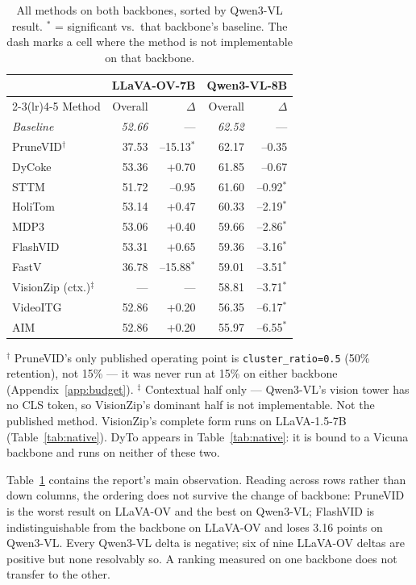 \documentclass[11pt]{article}
\begin{document}
\begin{table}[H]
  \centering
  \small
  \caption{All methods on both backbones, sorted by Qwen3-VL result.
  $^{*}$ = significant vs.\ that backbone's baseline. The dash marks a cell
  where the method is not implementable on that backbone.}
  \label{tab:summary}
  \begin{tabular}{lrrrr}
    \toprule
    & \multicolumn{2}{c}{LLaVA-OV-7B} & \multicolumn{2}{c}{Qwen3-VL-8B} \\
    \cmidrule(lr){2-3}\cmidrule(lr){4-5}
    Method & Overall & $\Delta$ & Overall & $\Delta$ \\
    \midrule
    \textit{Baseline} & \textit{52.66} & --- & \textit{62.52} & --- \\
    \midrule
    PruneVID$^{\dagger}$ & 37.53 & --15.13$^{*}$ & 62.17 & --0.35 \\
    DyCoke & 53.36 & +0.70 & 61.85 & --0.67 \\
    STTM & 51.72 & --0.95 & 61.60 & --0.92$^{*}$ \\
    HoliTom & 53.14 & +0.47 & 60.33 & --2.19$^{*}$ \\
    MDP3 & 53.06 & +0.40 & 59.66 & --2.86$^{*}$ \\
    FlashVID & 53.31 & +0.65 & 59.36 & --3.16$^{*}$ \\
    FastV & 36.78 & --15.88$^{*}$ & 59.01 & --3.51$^{*}$ \\
    VisionZip (ctx.)$^{\ddagger}$ & --- & --- & 58.81 & --3.71$^{*}$ \\
    VideoITG & 52.86 & +0.20 & 56.35 & --6.17$^{*}$ \\
    AIM & 52.86 & +0.20 & 55.97 & --6.55$^{*}$ \\
    \bottomrule
  \end{tabular}
\end{table}

\noindent\footnotesize
$^{\dagger}$ PruneVID's only published operating point is
\texttt{cluster\_ratio=0.5} (50\% retention), not 15\% --- it was never run
at 15\% on either backbone (Appendix~\ref{app:budget}). \quad
$^{\ddagger}$ Contextual half only --- Qwen3-VL's vision tower has no CLS
token, so VisionZip's dominant half is not implementable. Not the published
method. VisionZip's complete form runs on LLaVA-1.5-7B
(Table~\ref{tab:native}). \quad
DyTo appears in Table~\ref{tab:native}: it is bound to a Vicuna backbone and
runs on neither of these two.\normalsize

\medskip

Table~\ref{tab:summary} contains the report's main observation. Reading
across rows rather than down columns, the ordering does not survive the
change of backbone: PruneVID is the worst result on LLaVA-OV and the best on
Qwen3-VL; FlashVID is indistinguishable from the backbone on LLaVA-OV and
loses 3.16 points on Qwen3-VL. Every Qwen3-VL delta is negative; six of nine
LLaVA-OV deltas are positive but none resolvably so. A ranking measured on
one backbone does not transfer to the other.
\end{document}
